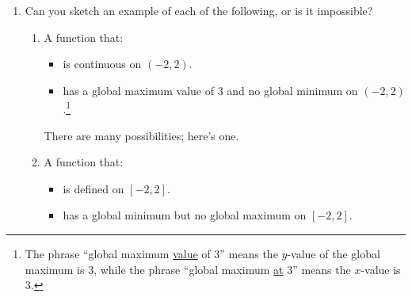 \documentclass{article}
\begin{document}
\begin{enumerate}
\item 


  Can you sketch an example of each of the following, or is it impossible?

    \begin{enumerate}
    \item
      \begin{problem}[2in]
        A function that:
        \begin{itemize}[nosep]
        \item is continuous on $(-2, 2)$.
        \item has a global maximum value of 3 and no global minimum on $(-2, 2)$.\footnote{The phrase ``global maximum \uline{value} of 3'' means the $y$-value of the global maximum is 3, while the phrase ``global maximum \uline{at} 3'' means the $x$-value is 3.}
        \end{itemize}
      \end{problem}

      \begin{solution} 
        There are many possibilities; here's one. 
        \begin{center}
        \end{center}
      \end{solution}

    \item
      \begin{problem}[2in]
        A function that:
        \begin{itemize}[nosep]
        \item is defined on $[-2, 2]$.
        \item has a global minimum but no global maximum on $[-2, 2]$.
        \end{itemize}
      \end{problem}


\end{enumerate}
\end{enumerate}
\end{document}
